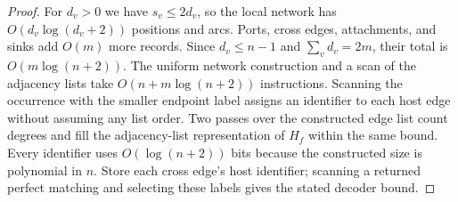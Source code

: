 \begin{proof}
For $d_v>0$ we have $s_v\le2d_v$, so the local network has
$O(d_v\log(d_v+2))$ positions and arcs. Ports, cross edges, attachments,
and sinks add $O(m)$ more records. Since $d_v\le n-1$ and
$\sum_v d_v=2m$, their total is $O(m\log(n+2))$. The uniform network
construction and a scan of the adjacency lists take
$O(n+m\log(n+2))$ instructions. Scanning the occurrence with the smaller
endpoint label assigns an identifier to each host edge without assuming any
list order. Two passes over the constructed edge list count degrees and fill
the adjacency-list representation of $H_f$ within the same bound.
Every identifier uses $O(\log(n+2))$
bits because the constructed size is polynomial in $n$. Store each cross
edge's host identifier; scanning a returned perfect matching and selecting
these labels gives the stated decoder bound.
\end{proof}

